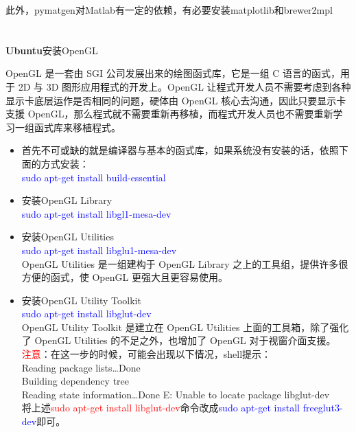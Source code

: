 \documentclass{article}      %
\begin{document}
此外，\textrm{pymatgen}对\textrm{Matlab}有一定的依赖，有必要安装\textrm{matplotlib}和\textrm{brewer2mpl}

\appendix
\section{}
\textbf{Ubuntu}安装\textrm{OpenGL} 

\textrm{OpenGL} 是一套由 \textrm{SGI} 公司发展出来的绘图函式库，它是一组 \textrm{C} 语言的函式，用于 \textrm{2D} 与 \textrm{3D} 图形应用程式的开发上。\textrm{OpenGL} 让程式开发人员不需要考虑到各种显示卡底层运作是否相同的问题，硬体由 \textrm{OpenGL} 核心去沟通，因此只要显示卡支援 \textrm{OpenGL}，那么程式就不需要重新再移植，而程式开发人员也不需要重新学习一组函式库来移植程式。

\begin{itemize}
	\item 首先不可或缺的就是编译器与基本的函式库，如果系统没有安装的话，依照下面的方式安装：\\ 
		\textcolor{blue}{sudo\; apt-get\; install\; build-essential}
	\item 安装\textrm{OpenGL Library}\\
		\textcolor{blue}{sudo\; apt-get\; install\; libgl1-mesa-dev}
	\item 安装\textrm{OpenGL Utilities}\\
		\textcolor{blue}{sudo\; apt-get\; install\; libglu1-mesa-dev}\\
		\textrm{OpenGL Utilities} 是一组建构于 \textrm{OpenGL Library} 之上的工具组，提供许多很方便的函式，使 \textrm{OpenGL} 更强大且更容易使用。
	\item 安装\textrm{OpenGL Utility Toolkit}\\
		\textcolor{blue}{sudo apt-get install libglut-dev}\\
		\textrm{OpenGL Utility Toolkit} 是建立在 \textrm{OpenGL Utilities} 上面的工具箱，除了强化了 \textrm{OpenGL Utilities} 的不足之外，也增加了 \textrm{OpenGL} 对于视窗介面支援。\\
		\textcolor{red}{注意}：在这一步的时候，可能会出现以下情况，\textrm{shell}提示：\\ 
		\textrm{Reading package lists\dots Done}\\
		\textrm{Building dependency tree}\\
		\textrm{Reading state information\dots Done}
		\textrm{E: Unable to locate package libglut-dev}\\
		将上述\textcolor{red}{sudo\; apt-get\; install\; libglut-dev}命令改成\textcolor{blue}{sudo\; apt-get\; install\; freeglut3-dev}即可。 
\end{itemize}
\end{document}
